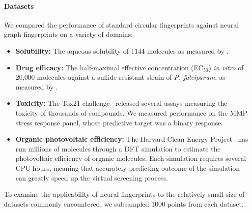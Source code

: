 \documentclass{article}
\newcommand{\citet}{\cite}
\begin{document}
\paragraph{Datasets}
We compared the performance of standard circular fingerprints against neural graph fingerprints on a variety of domains:
%
\begin{itemize}
\item {\bf Solubility:} The aqueous solubility of 1144 molecules as measured by \cite{delaney_data_2004}.
\item{\bf Drug efficacy:} The half-maximal effective concentration (EC$_{50}$) {\it in vitro} of 20,000 molecules against a sulfide-resistant strain of {\it P. falciparum}, as measured by \citet{gamo2010thousands}.
\item {\bf Toxicity:} The Tox21 challenge~\citet{tox21} released several assays measuring the toxicity of thousands of compounds.
We measured performance on the MMP stress response panel, whose predictive target was a binary response.
\item {\bf Organic photovoltaic efficiency:} The Harvard Clean Energy Project~\citet{hachmann2011harvard} has run millions of molecules through a DFT simulation to estimate the photovoltaic efficiency of organic molecules.
Each simulation requires several CPU hours, meaning that accurately predicting outcome of the simulation can greatly speed up the virtual screening process.
\end{itemize}
%
To examine the applicability of neural fingerprints to the relatively small size of datasets commonly encountered, we subsampled 1000 points from each dataset.
\end{document}
